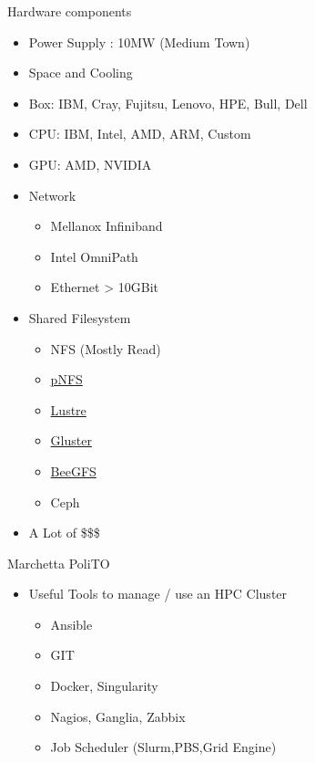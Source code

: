 \documentclass[ignorenonframetext,]{beamer}
\providecommand{\tightlist}{%
  \setlength{\itemsep}{0pt}\setlength{\parskip}{0pt}}
\begin{document}
\begin{frame}{Hardware components}

\begin{itemize}
\tightlist
\item
  Power Supply : 10MW (Medium Town)
\item
  Space and Cooling
\item
  Box: IBM, Cray, Fujitsu, Lenovo, HPE, Bull, Dell
\item
  CPU: IBM, Intel, AMD, ARM, Custom
\item
  GPU: AMD, NVIDIA
\item
  Network

  \begin{itemize}
  \tightlist
  \item
    Mellanox Infiniband
  \item
    Intel OmniPath
  \item
    Ethernet \textgreater{} 10GBit
  \end{itemize}

\item
  Shared Filesystem

  \begin{itemize}
  \tightlist
  \item
    NFS (Mostly Read)
  \item
    \href{http://www.pnfs.com/}{pNFS}
  \item
    \href{http://lustre.org/}{Lustre}
  \item
    \href{https://www.gluster.org/}{Gluster}
  \item
    \href{https://www.beegfs.io/content/}{BeeGFS}
  \item
    Ceph
  \end{itemize}

\item
  A Lot of \$\$\$
\end{itemize}


\end{frame}

\begin{frame}{Marchetta PoliTO}

\begin{itemize}
\tightlist
\item
  Useful Tools to manage / use an HPC Cluster

  \begin{itemize}
  \tightlist
  \item
    Ansible
  \item
    GIT
  \item
    Docker, Singularity
  \item
    Nagios, Ganglia, Zabbix
  \item
    Job Scheduler (Slurm,PBS,Grid Engine)
  \end{itemize}

\end{itemize}


\end{frame}
\end{document}
